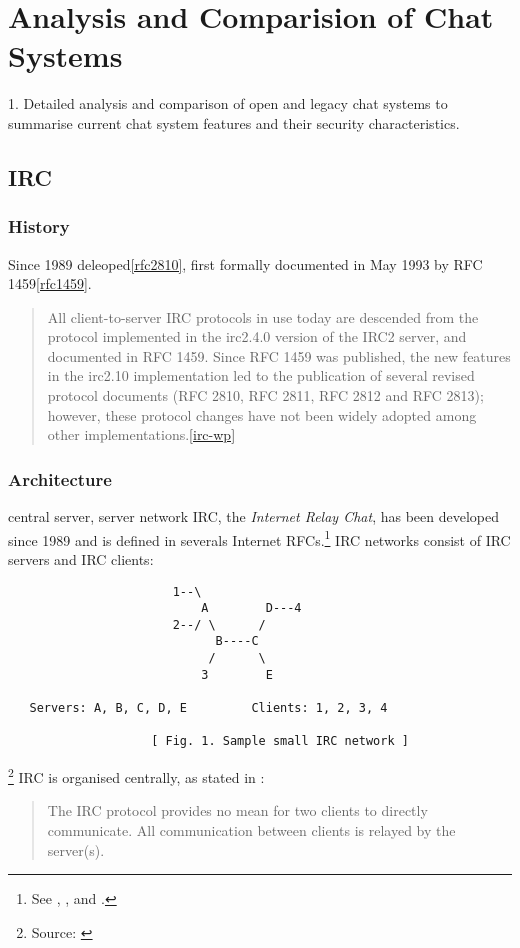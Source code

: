 \chapter{Analysis and Comparision of Chat Systems}

    1. Detailed analysis and comparison of open and legacy chat systems
        to summarise current chat system features and their
        security characteristics.


\section{IRC}
\subsection{History}

Since 1989 deleoped\ref{rfc2810},
first formally documented in May 1993 by RFC 1459\ref{rfc1459}.

\begin{quote}
All client-to-server IRC protocols in use today are descended from the protocol implemented in the irc2.4.0 version of the IRC2 server, and documented in RFC 1459. Since RFC 1459 was published, the new features in the irc2.10 implementation led to the publication of several revised protocol documents (RFC 2810, RFC 2811, RFC 2812 and RFC 2813); however, these protocol changes have not been widely adopted among other implementations.\ref{irc-wp}
\end{quote}

\subsection{Architecture}
central server, server network
IRC, the \textit{Internet Relay Chat}, has been developed since 1989
and is defined in severals Internet RFCs.\footnote{See \cite{rfc1459}, 
\cite{rfc2810}, \cite{rfc2812} and \cite{rfc2813}.}
IRC networks consist of IRC servers and IRC clients:

\begin{verbatim}
                       1--\
                           A        D---4
                       2--/ \      /
                             B----C
                            /      \
                           3        E

   Servers: A, B, C, D, E         Clients: 1, 2, 3, 4

                    [ Fig. 1. Sample small IRC network ]

\end{verbatim}\footnote{Source: \cite{rfc2810}}
IRC is organised centrally, as stated in \cite{rfc2810}:
\begin{quote}
The IRC protocol provides no mean for two clients to directly
communicate.  All communication between clients is relayed by the
server(s).
\end{quote}

